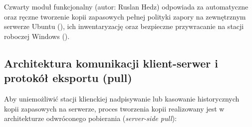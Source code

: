 Czwarty moduł funkcjonalny (autor: Ruslan Hedz) odpowiada za automatyczne oraz ręczne tworzenie kopii zapasowych pełnej polityki zapory na zewnętrznym serwerze Ubuntu (), ich inwentaryzację oraz bezpieczne przywracanie na stacji roboczej Windows ().

\subsection{Architektura komunikacji klient-serwer i protokół eksportu (pull)}\label{subsec:eksport-konfiguracji}

Aby uniemożliwić stacji klienckiej nadpisywanie lub kasowanie historycznych kopii zapasowych na serwerze, proces tworzenia kopii realizowany jest w architekturze odwróconego pobierania (\textit{server-side pull}):

